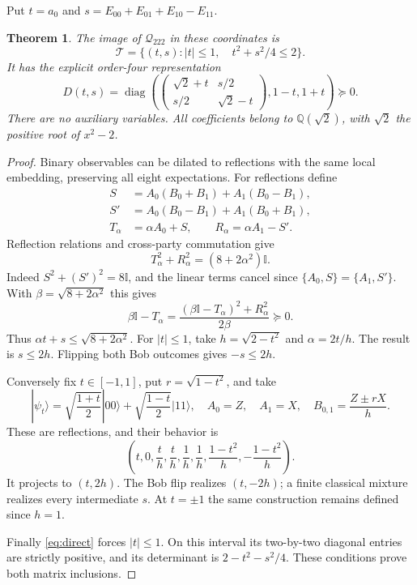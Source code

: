 \documentclass[11pt]{article}
\newcommand{\Q}{\mathcal Q_{222}}
\newcommand{\Id}{\mathbb I}
\newtheorem{theorem}{Theorem}
\begin{document}
Put $t=a_0$ and $s=E_{00}+E_{01}+E_{10}-E_{11}$.
\begin{theorem}
The image of $\Q$ in these coordinates is
\[
 \mathcal T=\{(t,s): |t|\leq1,\quad t^2+s^2/4\leq2\}.
\]
It has the explicit order-four representation
\begin{equation}
 D(t,s)=\operatorname{diag}\left(
 \begin{pmatrix}\sqrt2+t&s/2\\s/2&\sqrt2-t\end{pmatrix},
 1-t,1+t\right)\succeq0.                    \label{eq:direct}
\end{equation}
There are no auxiliary variables. All coefficients belong to
$\mathbb Q(\sqrt2)$, with $\sqrt2$ the positive root of $x^2-2$.
\end{theorem}
\begin{proof}
Binary observables can be dilated to reflections with the same local
embedding, preserving all eight expectations. For reflections define
\begin{align*}
 S&=A_0(B_0+B_1)+A_1(B_0-B_1),\\
 S'&=A_0(B_0-B_1)+A_1(B_0+B_1),\\
 T_\alpha&=\alpha A_0+S,\qquad R_\alpha=\alpha A_1-S'.
\end{align*}
Reflection relations and cross-party commutation give
\[
 T_\alpha^2+R_\alpha^2=(8+2\alpha^2)\Id.
\]
Indeed $S^2+(S')^2=8\Id$, and the linear terms cancel since
$\{A_0,S\}=\{A_1,S'\}$. With $\beta=\sqrt{8+2\alpha^2}$ this gives
\[
 \beta\Id-T_\alpha
 =\frac{(\beta\Id-T_\alpha)^2+R_\alpha^2}{2\beta}\succeq0.
\]
Thus $\alpha t+s\leq\sqrt{8+2\alpha^2}$. For $|t|\leq1$, take
$h=\sqrt{2-t^2}$ and $\alpha=2t/h$. The result is $s\leq2h$.
Flipping both Bob outcomes gives $-s\leq2h$.

Conversely fix $t\in[-1,1]$, put $r=\sqrt{1-t^2}$, and take
\[
 |\psi_t\rangle=\sqrt{\frac{1+t}{2}}|00\rangle+
                  \sqrt{\frac{1-t}{2}}|11\rangle,
 \quad A_0=Z,\quad A_1=X,\quad B_{0,1}=\frac{Z\pm rX}{h}.
\]
These are reflections, and their behavior is
\[
 \left(t,0,\frac t h,\frac t h,\frac1h,\frac1h,
                   \frac{1-t^2}{h},-\frac{1-t^2}{h}\right).
\]
It projects to $(t,2h)$. The Bob flip realizes $(t,-2h)$; a finite
classical mixture realizes every intermediate $s$. At $t=\pm1$ the
same construction remains defined since $h=1$.

Finally \eqref{eq:direct} forces $|t|\leq1$. On this interval its
two-by-two diagonal entries are strictly positive, and its determinant
is $2-t^2-s^2/4$. These conditions prove both matrix inclusions.
\end{proof}
\end{document}
